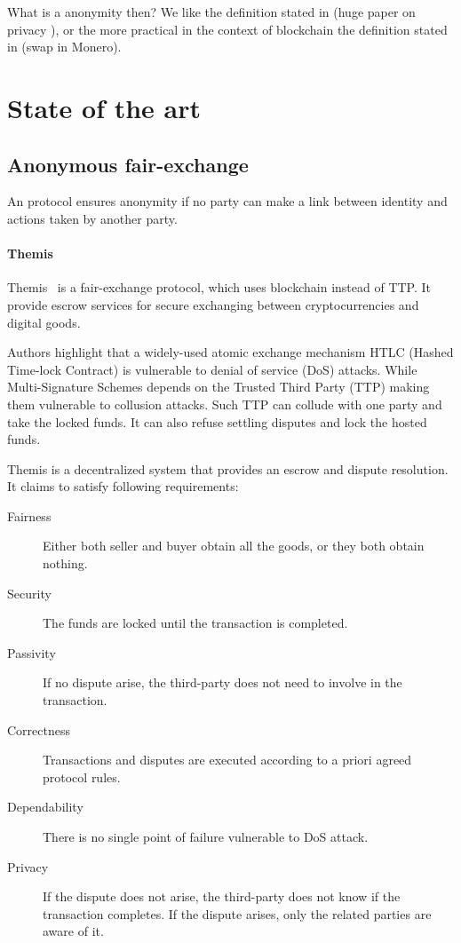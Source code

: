 \documentclass{article}
\begin{document}
What is a anonymity then? We like the definition stated in (huge paper on privacy ), or the more practical in the context of blockchain the definition stated in (swap in Monero). 


\section{State of the art}

\subsection{Anonymous fair-exchange}

An protocol ensures anonymity if no party can make a link between identity and actions taken by another party.

\paragraph{Themis} Themis~\cite{meng2019themis} is a fair-exchange protocol, which uses blockchain instead of TTP. It provide escrow services for secure exchanging between cryptocurrencies and digital goods.

Authors highlight that a widely-used atomic exchange mechanism HTLC (Hashed Time-lock Contract) is vulnerable to denial of service (DoS) attacks. While Multi-Signature Schemes depends on the Trusted Third Party (TTP) making them vulnerable to collusion attacks. Such TTP can collude with one party and take the locked funds. It can also refuse settling disputes and lock the hosted funds. 

Themis is a decentralized system that provides an escrow and dispute resolution. It claims to satisfy following requirements:
\begin{description}
    \item[Fairness] Either both seller and buyer obtain all the goods, or they both obtain nothing.
    \item[Security] The funds are locked until the transaction is completed.
    \item[Passivity] If no dispute arise, the third-party does not need to involve in the transaction.
    \item[Correctness] Transactions and disputes are executed according to a priori agreed protocol rules.
    \item[Dependability] There is no single point of failure vulnerable to DoS attack.
    \item[Privacy] If the dispute does not arise, the third-party does not know if the transaction completes. If the dispute arises, only the related parties are aware of it.    
\end{description}
\end{document}
